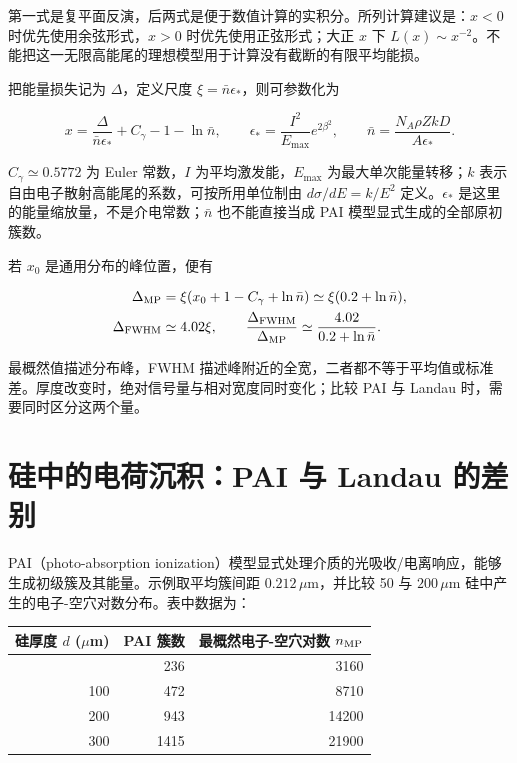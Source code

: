 \documentclass[
  11pt,
  a4paper,
  oneside,
  openany]{report}
\numberwithin{equation}{chapter}
\begin{document}
第一式是复平面反演，后两式是便于数值计算的实积分。所列计算建议是：\(x<0\)
时优先使用余弦形式，\(x>0\) 时优先使用正弦形式；大正 \(x\) 下
\(L(x)\sim x^{-2}\)。不能把这一无限高能尾的理想模型用于计算没有截断的有限平均能损。

把能量损失记为 \(\Delta\)，定义尺度
\(\xi=\bar n\epsilon_*\)，则可参数化为

\begin{equation}
x=\frac{\Delta}{\bar n\epsilon_*}+C_\gamma-1-\ln\bar n,
\qquad
\epsilon_*=\frac{I^2}{E_{\max}}e^{2\beta^2},
\qquad
\bar n=\frac{N_A\rho Z k D}{A\epsilon_*}.
\end{equation}

\(C_\gamma\simeq0.5772\) 为 Euler 常数，\(I\) 为平均激发能，\(E_{\max}\)
为最大单次能量转移；\(k\) 表示自由电子散射高能尾的系数，可按所用单位制由
\(d\sigma/dE=k/E^2\) 定义。\(\epsilon_*\)
是这里的能量缩放量，不是介电常数；\(\bar n\) 也不能直接当成 PAI
模型显式生成的全部原初簇数。

若 \(x_0\) 是通用分布的峰位置，便有

\begin{equation}
\begin{aligned}
\Delta_{\rm MP}&=\xi(x_0+1-C_\gamma+\ln\bar n)
\simeq\xi(0.2+\ln\bar n),\\
\Delta_{\rm FWHM}&\simeq4.02\xi,\qquad
\frac{\Delta_{\rm FWHM}}{\Delta_{\rm MP}}
\simeq\frac{4.02}{0.2+\ln\bar n}.
\end{aligned}
\end{equation}

最概然值描述分布峰，FWHM
描述峰附近的全宽，二者都不等于平均值或标准差。厚度改变时，绝对信号量与相对宽度同时变化；比较
PAI 与 Landau 时，需要同时区分这两个量。

\section{硅中的电荷沉积：PAI 与 Landau
的差别}\label{ux7845ux4e2dux7684ux7535ux8377ux6c89ux79efpai-ux4e0e-landau-ux7684ux5deeux522b}

PAI（photo-absorption
ionization）模型显式处理介质的光吸收/电离响应，能够生成初级簇及其能量。示例取平均簇间距
\(0.212\,\mu\mathrm m\)，并比较 50 与 \(200\,\mu\mathrm m\)
硅中产生的电子-空穴对数分布。表中数据为：

\begin{longtable}[]{@{}rrr@{}}
\toprule\noalign{}
硅厚度 \(d\) (\(\mu\)m) & PAI 簇数 & 最概然电子-空穴对数
\(n_{\rm MP}\) \\
\midrule\noalign{}
\endhead
\bottomrule\noalign{}
\endlastfoot
50 & 236 & 3160 \\
100 & 472 & 8710 \\
200 & 943 & 14200 \\
300 & 1415 & 21900 \\
\end{longtable}
\end{document}
